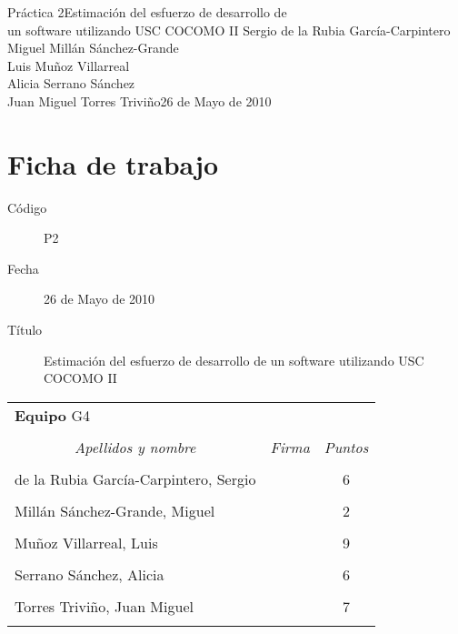 \documentclass[11pt,a4paper,spanish,twoside]{report}
\begin{document}


\vspace*{2.5cm}
{Práctica 2}{Estimación del esfuerzo de desarrollo de\\un software utilizando
USC COCOMO II}
{Sergio de la Rubia García-Carpintero\\Miguel Millán Sánchez-Grande\\
  Luis Muñoz Villarreal\\Alicia Serrano Sánchez\\
  Juan Miguel Torres Triviño}{26 de Mayo de 2010}

\vspace*{4cm}

\chapter*{Ficha de trabajo}
\begin{description}
\item[Código] P2
\item[Fecha] 26 de Mayo de 2010
\item[Título] Estimación del esfuerzo de desarrollo de un software utilizando
  USC COCOMO II
\end{description}

\begin{table}[!ht]
  \centering
  \begin{tabular}{lp{5cm}c}
    \multicolumn{3}{l}{\Large \textbf{Equipo} G4} \\ \\
    \multicolumn{1}{c}{\emph{Apellidos y nombre}} & 
    \multicolumn{1}{c}{\emph{Firma}} & \emph{Puntos} \\
    \hline \\
    de la Rubia García-Carpintero, Sergio & & 6 \\ \\
    Millán Sánchez-Grande, Miguel         & & 2 \\ \\
    Muñoz Villarreal, Luis                & & 9 \\ \\
    Serrano Sánchez, Alicia               & & 6 \\ \\
    Torres Triviño, Juan Miguel           & & 7 \\ \\
    \hline
  \end{tabular}
\end{table}
\end{document}
